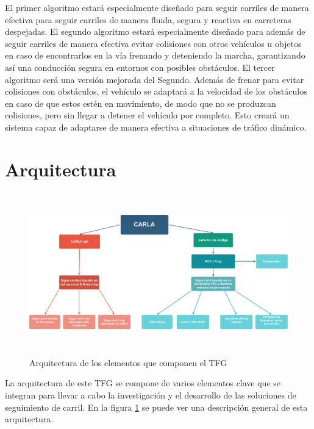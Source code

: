 \bigskip

El primer algoritmo estará especialmente diseñado para seguir carriles de manera efectiva para seguir carriles de manera fluida, segura y reactiva en carreteras despejadas. El segundo algoritmo estará especialmente diseñado para además de seguir carriles de manera efectiva evitar colisiones con otros vehículos u objetos en caso de encontrarlos en la vía frenando y deteniendo la marcha, garantizando así una conducción segura en entornos con posibles obstáculos. El tercer algoritmo será una versión mejorada del Segundo. Además de frenar para evitar colisiones con obstáculos, el vehículo se adaptará a la velocidad de los obstáculos en caso de que estos estén en movimiento, de modo que no se produzcan colisiones, pero sin llegar a detener el vehículo por completo. Esto creará un sistema capaz de adaptarse de manera efectiva a situaciones de tráfico dinámico.


\section{Arquitectura}

\begin{figure} [h]
	 \center
	\includegraphics[height=7cm]{imagenes/cap4/Arquitectura.pdf}
	\caption[Arquitectura de los elementos que componen el TFG ]{Arquitectura de los elementos que componen el TFG}
	\label{fig:Arquitectura del TFG}
\end{figure}

La arquitectura de este \ac{TFG} se compone de varios elementos clave que se integran para llevar a cabo la investigación y el desarrollo de las soluciones de seguimiento de carril. En la figura \ref{fig:Arquitectura del TFG} se puede ver una descripción general de esta arquitectura.


\bigskip


